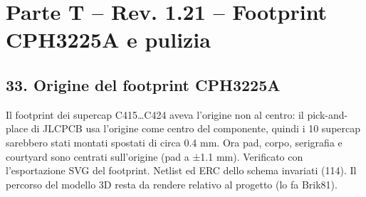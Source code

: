 \clearpage
\section[Parte T – Rev. 1.21 – Footprint CPH3225A e pulizia]{Parte T – Rev. 1.21 – Footprint CPH3225A e pulizia}

\subsection[33. Origine del footprint CPH3225A]{33. Origine del footprint CPH3225A}

Il footprint dei supercap C415…C424 aveva l'origine non al centro: il pick-and-place di JLCPCB usa l'origine come centro del componente, quindi i 10 supercap sarebbero stati montati spostati di circa 0.4 mm. Ora pad, corpo, serigrafia e courtyard sono centrati sull'origine (pad a ±1.1 mm). Verificato con l'esportazione SVG del footprint. Netlist ed ERC dello schema invariati (114). Il percorso del modello 3D resta da rendere relativo al progetto (lo fa Brik81).
